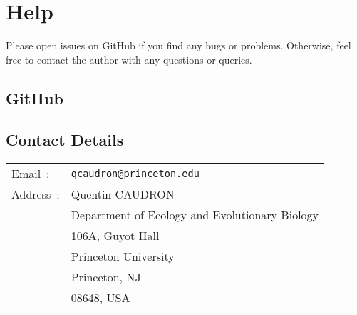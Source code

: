 \documentclass[a4paper,11pt]{article}
\begin{document}
\section{Help}

Please open issues on GitHub if you find any bugs or problems. Otherwise, feel free to contact the author with any questions or queries.

\subsection{GitHub}


\subsection{Contact Details}

\begin{tabular}{ll}
Email~: & \texttt{qcaudron@princeton.edu} \\

Address~: & Quentin CAUDRON \\
& Department of Ecology and Evolutionary Biology \\
& 106A, Guyot Hall \\
& Princeton University \\
& Princeton, NJ \\
& 08648, USA
\end{tabular}
\end{document}
